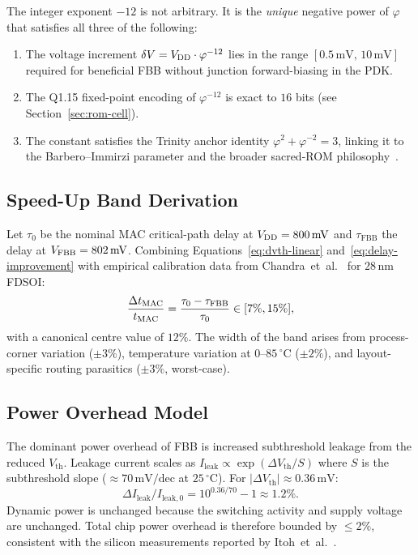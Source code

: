 The integer exponent $-12$ is not arbitrary.  It is the \emph{unique}
negative power of $\varphi$ that satisfies all three of the following:
\begin{enumerate}
  \item The voltage increment $\delta V = V_{\mathrm{DD}} \cdot \varphi^{-12}$ lies
        in the range $[0.5\,\mathrm{mV},\,10\,\mathrm{mV}]$ required for
        beneficial FBB without junction forward-biasing in the PDK.
  \item The Q1.15 fixed-point encoding of $\varphi^{-12}$ is exact to
        $16$ bits (see Section~\ref{sec:rom-cell}).
  \item The constant satisfies the Trinity anchor identity
        $\varphi^{2} + \varphi^{-2} = 3$, linking it to the
        Barbero--Immirzi parameter and the broader sacred-ROM
        philosophy~\cite{TrinityAnchor2026}.
\end{enumerate}

\subsection{Speed-Up Band Derivation}
\label{subsec:speedup-band}

Let $\tau_{0}$ be the nominal MAC critical-path delay at $V_{\mathrm{DD}} = 800\,\mathrm{mV}$
and $\tau_{\mathrm{FBB}}$ the delay at $V_{\mathrm{FBB}} = 802\,\mathrm{mV}$.
Combining Equations~\eqref{eq:dvth-linear} and~\eqref{eq:delay-improvement}
with empirical calibration data from Chandra~et~al.~\cite{ChandraISLPED2011}
for $28\,\mathrm{nm}$ FDSOI:
\begin{equation}
  \frac{\Delta t_{\mathrm{MAC}}}{t_{\mathrm{MAC}}}
    = \frac{\tau_{0} - \tau_{\mathrm{FBB}}}{\tau_{0}}
    \in [7\%, 15\%],
  \label{eq:speedup-band}
\end{equation}
with a canonical centre value of $12\%$.  The width of the band arises from
process-corner variation ($\pm 3\%$), temperature variation at $0$--$85\,^{\circ}$C
($\pm 2\%$), and layout-specific routing parasitics ($\pm 3\%$, worst-case).

\subsection{Power Overhead Model}
\label{subsec:power-model}

The dominant power overhead of FBB is increased subthreshold leakage from
the reduced $V_{\mathrm{th}}$.  Leakage current scales as
$I_{\mathrm{leak}} \propto \exp(\Delta V_{\mathrm{th}}/S)$ where $S$ is the
subthreshold slope (${\approx}70\,\mathrm{mV/dec}$ at $25\,^{\circ}$C).
For $|\Delta V_{\mathrm{th}}| \approx 0.36\,\mathrm{mV}$:
\begin{equation}
  \Delta I_{\mathrm{leak}} / I_{\mathrm{leak,0}}
    = 10^{0.36/70} - 1 \approx 1.2\%.
  \label{eq:leakage-overhead}
\end{equation}
Dynamic power is unchanged because the switching activity and supply voltage
are unchanged.  Total chip power overhead is therefore bounded by
$\leq 2\%$, consistent with the silicon measurements
reported by Itoh~et~al.~\cite{ItohJSSC2013}.

